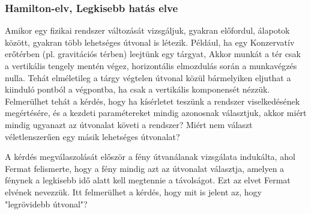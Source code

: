 \documentclass[../main.tex]{subfiles}
\begin{document}
\subsubsection{Hamilton-elv, Legkisebb hatás elve}
Amikor egy fizikai rendszer változását vizsgáljuk, gyakran előfordul, álapotok között, gyakran több lehetséges útvonal is létezik. Például, ha egy Konzervatív erőtérben (pl. gravitációs térben) leejtünk egy tárgyat,
Akkor munkát a tér csak a vertikális tengely mentén végez, horizontális elmozdulás során a munkavégzés nulla. Tehát elméletileg a tárgy végtelen útvonal közül bármelyiken eljuthat a kiinduló pontból a végpontba, ha csak a vertikális komponensét nézzük.
Felmerülhet tehát a kérdés, hogy ha kísérletet teszünk a rendszer viselkedésének megértésére, és a kezdeti paramétereket mindig azonosnak választjuk, akkor miért mindig ugyanazt az útvonalat követi a rendszer? Miért nem választ véletlenszerűen egy másik lehetséges útvonalat?

A kérdés megválaszolását először a fény útvanálanak vizsgálata indukálta, ahol Fermat felismerte, hogy a fény mindig azt az útvonalat választja, amelyen a fénynek a legkisebb idő alatt kell megtennie a távolságot. Ezt az elvet Fermat elvének nevezzük.
Itt felmerülhet a kérdés, hogy mit is jelent az, hogy "legrövidebb útvonal"? 
\end{document}
